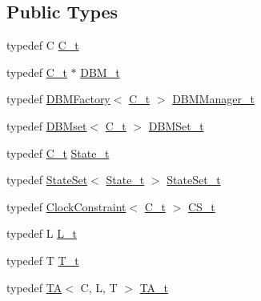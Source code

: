 \subsection*{Public Types}
\begin{DoxyCompactItemize}
\item 
typedef C \mbox{\hyperlink{classgraphsat_1_1_t_a_s_a05b063b91c0ab2a4f94380de78344d72}{C\+\_\+t}}
\item 
typedef \mbox{\hyperlink{classgraphsat_1_1_t_a_s_a05b063b91c0ab2a4f94380de78344d72}{C\+\_\+t}} $\ast$ \mbox{\hyperlink{classgraphsat_1_1_t_a_s_af66c6ca9cd8c49e5025c7e9abf4e6573}{D\+B\+M\+\_\+t}}
\item 
typedef \mbox{\hyperlink{classgraphsat_1_1_d_b_m_factory}{D\+B\+M\+Factory}}$<$ \mbox{\hyperlink{classgraphsat_1_1_t_a_s_a05b063b91c0ab2a4f94380de78344d72}{C\+\_\+t}} $>$ \mbox{\hyperlink{classgraphsat_1_1_t_a_s_a036641a48bebbe8cbf3b1a975dca220a}{D\+B\+M\+Manager\+\_\+t}}
\item 
typedef \mbox{\hyperlink{classgraphsat_1_1_d_b_mset}{D\+B\+Mset}}$<$ \mbox{\hyperlink{classgraphsat_1_1_t_a_s_a05b063b91c0ab2a4f94380de78344d72}{C\+\_\+t}} $>$ \mbox{\hyperlink{classgraphsat_1_1_t_a_s_a2844788b40afdf989204ba80ba367750}{D\+B\+M\+Set\+\_\+t}}
\item 
typedef \mbox{\hyperlink{classgraphsat_1_1_t_a_s_a05b063b91c0ab2a4f94380de78344d72}{C\+\_\+t}} \mbox{\hyperlink{classgraphsat_1_1_t_a_s_a21e6a612eebc293b90e198d4adf25f0f}{State\+\_\+t}}
\item 
typedef \mbox{\hyperlink{classgraphsat_1_1_state_set}{State\+Set}}$<$ \mbox{\hyperlink{classgraphsat_1_1_t_a_s_a21e6a612eebc293b90e198d4adf25f0f}{State\+\_\+t}} $>$ \mbox{\hyperlink{classgraphsat_1_1_t_a_s_a5ed864677e2da64583f92b84d38d0717}{State\+Set\+\_\+t}}
\item 
typedef \mbox{\hyperlink{classgraphsat_1_1_clock_constraint}{Clock\+Constraint}}$<$ \mbox{\hyperlink{classgraphsat_1_1_t_a_s_a05b063b91c0ab2a4f94380de78344d72}{C\+\_\+t}} $>$ \mbox{\hyperlink{classgraphsat_1_1_t_a_s_a88a8d728033de46e942d307ee09fa576}{C\+S\+\_\+t}}
\item 
typedef L \mbox{\hyperlink{classgraphsat_1_1_t_a_s_a34bf8786372c42fbf45e9d3274a5e325}{L\+\_\+t}}
\item 
typedef T \mbox{\hyperlink{classgraphsat_1_1_t_a_s_abbc05c03de984fb78282fd1feaf13c41}{T\+\_\+t}}
\item 
typedef \mbox{\hyperlink{classgraphsat_1_1_t_a}{TA}}$<$ C, L, T $>$ \mbox{\hyperlink{classgraphsat_1_1_t_a_s_a74d326d2d6c5868f7394bfd460544a3b}{T\+A\+\_\+t}}

\end{DoxyCompactItemize}
